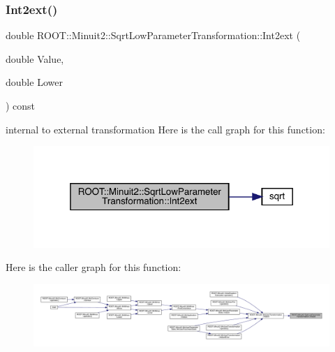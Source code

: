 \mbox{\label{classROOT_1_1Minuit2_1_1SqrtLowParameterTransformation_aaa3325280a05beb0e3f07b542d0aa7d8}} 
\subsubsection{\texorpdfstring{Int2ext()}{Int2ext()}\hspace{0.1cm}{\footnotesize\ttfamily [2/2]}}
{\footnotesize\ttfamily double R\+O\+O\+T\+::\+Minuit2\+::\+Sqrt\+Low\+Parameter\+Transformation\+::\+Int2ext (\begin{DoxyParamCaption}\item[{double}]{Value,  }\item[{double}]{Lower }\end{DoxyParamCaption}) const}

internal to external transformation Here is the call graph for this function\+:\nopagebreak
\begin{figure}[H]
\begin{center}
\leavevmode
\includegraphics[width=319pt]{df/db9/classROOT_1_1Minuit2_1_1SqrtLowParameterTransformation_aaa3325280a05beb0e3f07b542d0aa7d8_cgraph}
\end{center}
\end{figure}
Here is the caller graph for this function\+:\nopagebreak
\begin{figure}[H]
\begin{center}
\leavevmode
\includegraphics[width=350pt]{df/db9/classROOT_1_1Minuit2_1_1SqrtLowParameterTransformation_aaa3325280a05beb0e3f07b542d0aa7d8_icgraph}
\end{center}
\end{figure}


